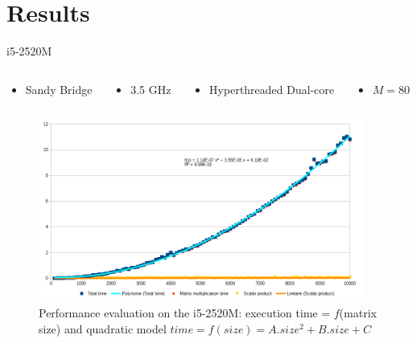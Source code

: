 \documentclass{beamer}
\begin{document}
\section{Results}
\begin{frame}{i5-2520M}
\begin{columns}
\begin{column}{0.25\linewidth}
\begin{itemize}
\item Sandy Bridge
\end{itemize}
\end{column}
\begin{column}{0.25\linewidth}
\begin{itemize}
\item 3.5 GHz
\end{itemize}
\end{column}
\begin{column}{0.3\linewidth}
\begin{itemize}
\item Hyperthreaded Dual-core
\end{itemize}
\end{column}
\begin{column}{0.25\linewidth}
\begin{itemize}
\item $M=80$
\end{itemize}
\end{column}
\end{columns}
\begin{figure}
\begin{columns}
\begin{column}{0.8\linewidth}
\includegraphics[width=\linewidth]{lenovo-i5-2emeGen.png}
\end{column}
\begin{column}{0.2\linewidth}
\caption{Performance evaluation on the i5-2520M: execution time = $f$(matrix size) and quadratic model $time=f(size)=A.size^2 + B.size + C$}
\end{column}
\end{columns}
\end{figure}
\end{frame}
\end{document}
